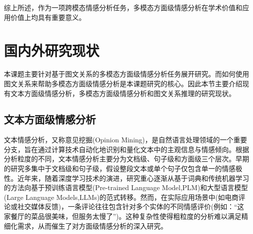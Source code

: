 综上所述，作为一项跨模态情感分析任务，多模态方面级情感分析在学术价值和应用价值上均具有重要意义。

\section{国内外研究现状}
本课题主要针对基于图文关系的多模态方面级情感分析任务展开研究。而如何使用图文关系来帮助多模态方面级情感分析是本课题研究的核心。因此本节主要介绍现有文本方面级情感分析，多模态方面级情感分析和图文关系推理的研究现状。

\subsection{文本方面级情感分析}
文本情感分析，又称意见挖掘(Opinion Mining)，是自然语言处理领域的一个重要分支，旨在通过计算技术自动化地识别和量化文本中的主观信息与情感倾向。根据分析粒度的不同，文本情感分析主要分为文档级、句子级和方面级三个层次。早期的研究多集中于文档级和句子级，假设整段文本或单个句子仅包含单一的情感极性。近年来，随着深度学习技术的演进，研究重心逐渐从基于词典和传统机器学习的方法向基于预训练语言模型(Pre-trained Language Model,PLM)和大型语言模型(Large Language Models,LLMs)的范式转移。然而，在实际应用场景中(如电商评论或社交媒体反馈)，一条评论往往包含针对多个实体的不同情感评价(例如：“这家餐厅的菜品很美味，但服务太慢了”)。这种复杂性使得粗粒度的分析难以满足精细化需求，从而催生了对方面级情感分析的深入研究\cite{zhang2022survey}。


